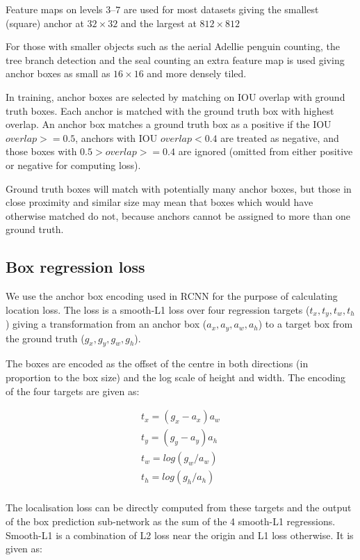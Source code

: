 Feature maps on levels $3$--$7$ are used for most datasets giving the smallest (square) anchor at $32\times32$ and the largest at $812\times812$ 

For those with smaller objects such as the aerial Adellie penguin counting, the tree branch detection and the seal counting an extra feature map is used giving anchor boxes as small as $16\times16$ and more densely tiled.

In training, anchor boxes are selected by matching on \gls{IOU} overlap with ground truth boxes. Each anchor is matched with the ground truth box with highest overlap. An anchor box matches a ground truth box as a positive if the IOU $ overlap >= 0.5 $, anchors with IOU $ overlap < 0.4 $ are treated as negative, and those boxes with $ 0.5 > overlap >= 0.4 $ are ignored (omitted from either positive or negative for computing loss).

Ground truth boxes will match with potentially many anchor boxes, but those in close proximity and similar size may mean that boxes which would have otherwise matched do not, because anchors cannot be assigned to more than one ground truth.

\subsection {Box regression loss}
\label{sec:regression}


We use the anchor box encoding used in \gls{RCNN} \cite{Wang2017} for the purpose of calculating location loss. The loss is a smooth-L1 loss over four regression targets ($t_x, t_y, t_w, t_h$) giving a transformation from an anchor box ($a_x, a_y, a_w, a_h$)  to a target box from the ground truth ($g_x, g_y, g_w, g_h$). 

The boxes are encoded as the offset of the centre in both directions (in proportion to the box size) and the log scale of height and width. The encoding of the four targets are given as:

\begin{equation}
\begin{split}
t_x = (g_x - a_x) a_w\\
t_y = (g_y - a_y) a_h\\
t_w = log(g_w / a_w)\\
t_h = log(g_h / a_h)\\
\end{split}
\label{eq:encoding_rcnn}
\end{equation}

The localisation loss can be directly computed from these targets and the output of the box prediction sub-network as the sum of the 4 smooth-L1 regressions. Smooth-L1 is a combination of L2 loss near the origin and L1 loss otherwise. It is given as:

